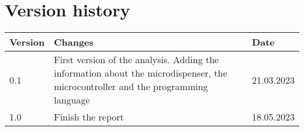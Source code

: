 \chapter{Version history}
\label{chap:report-versions}

\begin{tabular}{|m{}|m{}|m{}|}
 \hline
 \textbf{Version} & \textbf{Changes} & \textbf{Date} \\ [0.5ex]
 \hline
 0.1 & First version of the analysis. Adding the information about the microdispenser, the microcontroller and the programming language & 21.03.2023  \\
\hline
 1.0 & Finish the report & 18.05.2023  \\
\hline
\end{tabular}